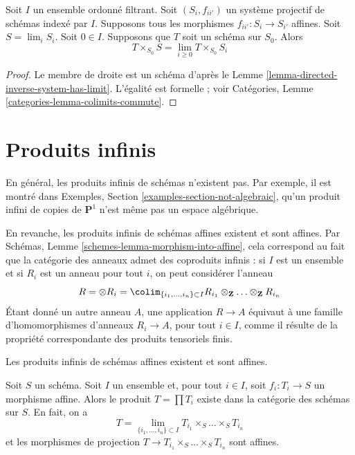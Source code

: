 \begin{lemma}
\label{lemma-scheme-over-limit}
Soit $I$ un ensemble ordonné filtrant.
Soit $(S_i, f_{ii'})$ un système projectif de schémas indexé par $I$.
Supposons tous les morphismes $f_{ii'} : S_i \to S_{i'}$ affines.
Soit $S = \lim_i S_i$. Soit $0 \in I$. Supposons que $T$ soit un schéma
sur $S_0$. Alors
$$
T \times_{S_0} S = \lim_{i \geq 0} T \times_{S_0} S_i
$$
\end{lemma}

\begin{proof}
Le membre de droite est un schéma d'après le
Lemme \ref{lemma-directed-inverse-system-has-limit}. L'égalité est formelle ;
voir Catégories, Lemme \ref{categories-lemma-colimits-commute}.
\end{proof}



\section{Produits infinis}
\label{section-inifinite-products}

\noindent
En général, les produits infinis de schémas n'existent pas. Par exemple,
il est montré dans Exemples, Section \ref{examples-section-not-algebraic},
qu'un produit infini de copies de $\mathbf{P}^1$ n'est même pas un espace
algébrique.

\medskip\noindent
En revanche, les produits infinis de schémas affines existent et sont
affines. Par Schémas, Lemme \ref{schemes-lemma-morphism-into-affine}, cela
correspond au fait que la catégorie des anneaux admet des coproduits
infinis : si $I$ est un ensemble et si $R_i$ est un anneau pour tout $i$,
on peut considérer l'anneau
$$
R = \otimes R_i =
\colim_{\{i_1, \ldots, i_n\} \subset I}
R_{i_1} \otimes_\mathbf{Z} \ldots \otimes_\mathbf{Z} R_{i_n}
$$
Étant donné un autre anneau $A$, une application $R \to A$ équivaut à une
famille d'homomorphismes d'anneaux $R_i \to A$, pour tout $i \in I$, comme
il résulte de la propriété correspondante des produits tensoriels finis.

\begin{lemma}
\label{lemma-infinite-product}
\begin{slogan}
Les produits infinis de schémas affines existent et sont affines.
\end{slogan}
Soit $S$ un schéma. Soit $I$ un ensemble et, pour tout $i \in I$, soit
$f_i : T_i \to S$ un morphisme affine. Alors le produit $T = \prod T_i$
existe dans la catégorie des schémas sur $S$. En fait, on a
$$
T = \lim_{\{i_1, \ldots, i_n\} \subset I}
T_{i_1} \times_S \ldots \times_S T_{i_n}
$$
et les morphismes de projection
$T \to T_{i_1} \times_S \ldots \times_S T_{i_n}$ sont affines.
\end{lemma}

